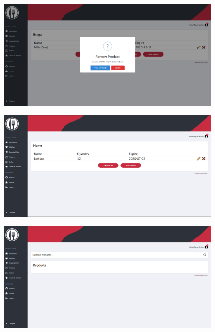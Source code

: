 \documentclass[a4paper]{report}
\begin{document}
    \begin{figure}[H]
        \centering
            \includegraphics[width=\textwidth]{images/produto_final/eliminar_produto.png}
    \end{figure}

    \begin{figure}[H]
        \centering
            \includegraphics[width=\textwidth]{images/produto_final/pagina_iventario_partilhado.png}
    \end{figure}

    \begin{figure}[H]
        \centering
            \includegraphics[width=\textwidth]{images/produto_final/procura_de_produtos.png}
    \end{figure}
\end{document}
